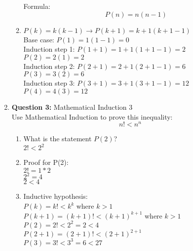 \documentclass[11pt]{article}
\begin{document}
\begin{enumerate}
\begin{enumerate}[label=(\alph*)]
    Formula: 
\begin{equation*}
    P(n) = n(n-1)
\end{equation*}
    \item 
    $P(k) = k(k-1) \rightarrow P(k+1) = k+1(k+1-1)$\\
    Base case: $P(1) = 1(1-1) = 0$ \\
    Induction step 1: $P(1+1) = 1+1(1+1-1) = 2$ \\
    $P(2) = 2(1) = 2$ \\
    Induction step 2: $P(2+1) = 2+1(2+1-1) = 6$ \\
    $P(3) = 3(2) = 6$ \\
    Induction step 3: $P(3+1) = 3+1(3+1-1) = 12$ \\
    $P(4) = 4(3) = 12$ 
\end{enumerate}
\item
\textbf{Question 3:} Mathematical Induction 3 \\
Use Mathematical Induction to prove this inequality: 
\begin{equation*}
    n! < n^n
\end{equation*}
\begin{enumerate}[label=(\alph*)]
    \item
    What is the statement $P(2)$? \\
    $2! < 2^2$
    \item 
    Proof for P(2): \\
    $2! = 1 * 2$\\
    $2^2 = 4$\\
    $2 < 4$ 
    \item 
    Inductive hypothesis: \\
    $P(k) = k! < k^k$ where $k > 1$ \\
    $P(k+1) = (k+1)! < (k+1)^{k+1}$ where $k > 1$ \\
    $P(2) = 2! < 2^2 = 2 < 4$ \\
    $P(2+1) = (2+1)! < (2+1)^{2+1}$ \\
    $P(3) = 3! < 3^3 = 6 < 27$
\end{enumerate}
\end{enumerate}
\end{document}
